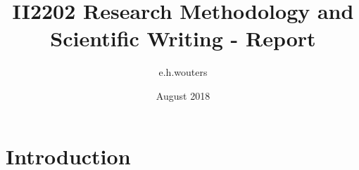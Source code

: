 \documentclass{article}
\title{II2202 Research Methodology and Scientific Writing - Report}
\author{e.h.wouters }
\date{August 2018}
\begin{document}
\maketitle

\section{Introduction}
\end{document}
